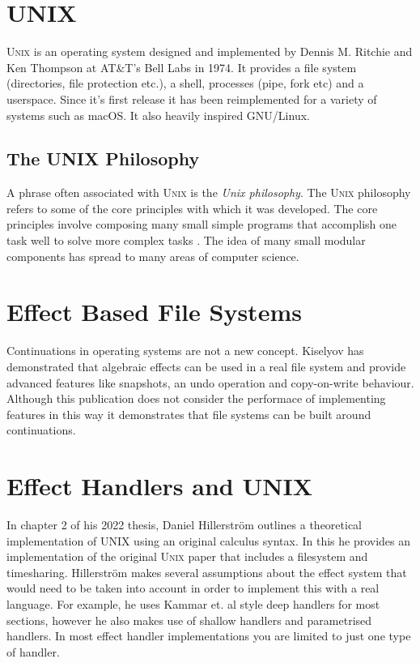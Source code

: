 \documentclass[logo,bsc,singlespacing,parskip]{infthesis}
\begin{document}
\section{\textsc{UNIX}}

\textsc{Unix} \cite{ritchie1978unix} is an operating system designed and
implemented by Dennis M. Ritchie and Ken Thompson at AT\&T's Bell Labs in 1974.
It provides a file system (directories, file protection etc.), a shell,
processes (pipe, fork etc) and a userspace. Since it's first release it has been
reimplemented for a variety of systems such as macOS. It also heavily inspired GNU/Linux.

\subsection{The UNIX Philosophy}

A phrase often associated with \textsc{Unix} is the \emph{Unix philosophy}.  The
\textsc{Unix} philosophy refers to some of the core principles with which it was
developed. The core principles involve composing many small simple programs that
accomplish one task well to solve more complex tasks \cite{raymond2003art}. The
idea of many small modular components has spread to many areas of computer
science.

\section{Effect Based File Systems}

Continuations in operating systems \cite{DBLP:conf/context/KiselyovS07} are not
a new concept.  Kiselyov has demonstrated that algebraic effects can be used in
a real file system and provide advanced features like snapshots, an undo
operation and copy-on-write behaviour. Although this publication does not
consider the performace of implementing features in this way it demonstrates that
file systems can be built around continuations.

\section{Effect Handlers and UNIX}

In chapter 2 of his 2022 thesis, Daniel Hillerstr\"{o}m
\cite{hillerstrom2022foundations} outlines a theoretical implementation of UNIX
using an original calculus syntax. In this he provides an implementation of the
original \textsc{Unix} paper \cite{ritchie1978unix} that includes a filesystem
and timesharing. Hillerstr\"{o}m makes several assumptions about the effect
system that would need to be taken into account in order to implement this with
a real language. For example, he uses Kammar et. al \cite{kammar2013handlers}
style deep handlers for most sections, however he also makes use of shallow
handlers and parametrised handlers. In most effect handler implementations you
are limited to just one type of handler.
\end{document}
